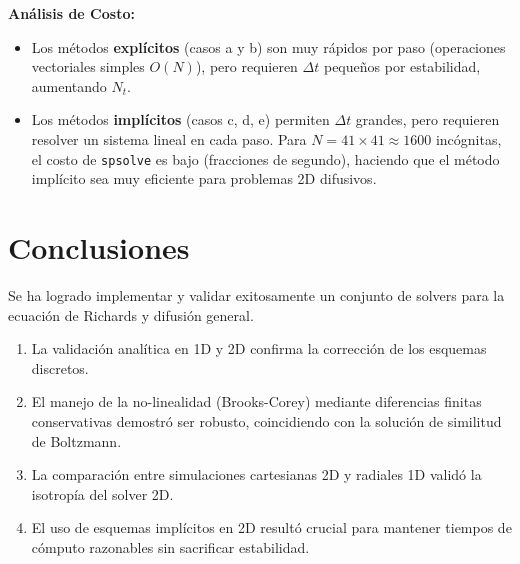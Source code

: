 \documentclass[a4paper,12pt]{article}
\begin{document}
\textbf{Análisis de Costo:}
\begin{itemize}
    \item Los métodos \textbf{explícitos} (casos a y b) son muy rápidos por paso (operaciones vectoriales simples $O(N)$), pero requieren $\Delta t$ pequeños por estabilidad, aumentando $N_t$.
    \item Los métodos \textbf{implícitos} (casos c, d, e) permiten $\Delta t$ grandes, pero requieren resolver un sistema lineal en cada paso. Para $N=41\times41 \approx 1600$ incógnitas, el costo de \texttt{spsolve} es bajo (fracciones de segundo), haciendo que el método implícito sea muy eficiente para problemas 2D difusivos.
\end{itemize}

\section{Conclusiones}
Se ha logrado implementar y validar exitosamente un conjunto de solvers para la ecuación de Richards y difusión general.
\begin{enumerate}
    \item La validación analítica en 1D y 2D confirma la corrección de los esquemas discretos.
    \item El manejo de la no-linealidad (Brooks-Corey) mediante diferencias finitas conservativas demostró ser robusto, coincidiendo con la solución de similitud de Boltzmann.
    \item La comparación entre simulaciones cartesianas 2D y radiales 1D validó la isotropía del solver 2D.
    \item El uso de esquemas implícitos en 2D resultó crucial para mantener tiempos de cómputo razonables sin sacrificar estabilidad.
\end{enumerate}
\end{document}
